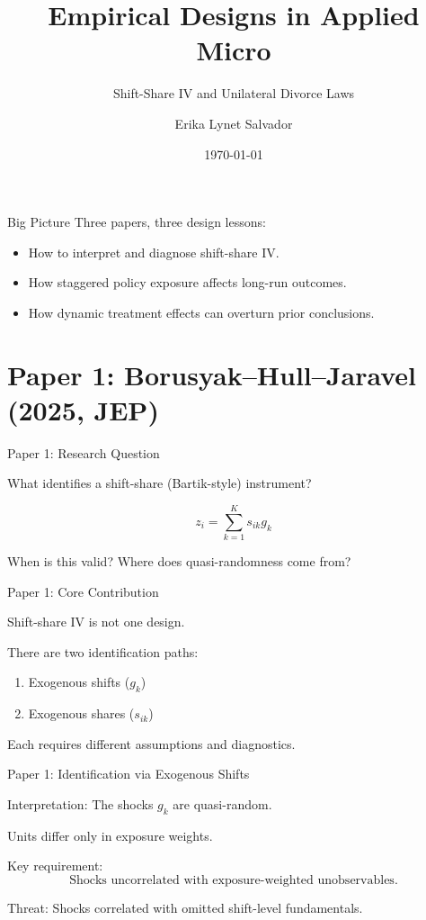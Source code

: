 \documentclass[aspectratio=169]{beamer}
\title{Empirical Designs in Applied Micro}
\subtitle{Shift-Share IV and Unilateral Divorce Laws}
\author{Erika Lynet Salvador}
\date{\today}
\begin{document}
\begin{frame}
\titlepage
\end{frame}

\begin{frame}{Big Picture}
Three papers, three design lessons:

\begin{itemize}
    \item How to interpret and diagnose shift-share IV.
    \item How staggered policy exposure affects long-run outcomes.
    \item How dynamic treatment effects can overturn prior conclusions.
\end{itemize}

\end{frame}

\section{Paper 1: Borusyak--Hull--Jaravel (2025, JEP)}

\begin{frame}{Paper 1: Research Question}

What identifies a shift-share (Bartik-style) instrument?

\[
z_i = \sum_{k=1}^K s_{ik} g_k
\]

When is this valid?
Where does quasi-randomness come from?

\end{frame}

\begin{frame}{Paper 1: Core Contribution}

Shift-share IV is not one design.

There are two identification paths:

\begin{enumerate}
    \item Exogenous shifts (\(g_k\))
    \item Exogenous shares (\(s_{ik}\))
\end{enumerate}

Each requires different assumptions and diagnostics.

\end{frame}

\begin{frame}{Paper 1: Identification via Exogenous Shifts}

Interpretation:
The shocks \(g_k\) are quasi-random.

Units differ only in exposure weights.

Key requirement:
\[
\text{Shocks uncorrelated with exposure-weighted unobservables.}
\]

Threat:
Shocks correlated with omitted shift-level fundamentals.

\end{frame}
\end{document}

